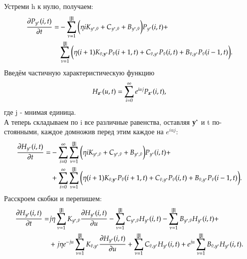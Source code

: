 Устреми h к нулю, получаем:
\begin{align*} 
    \pdv{P_{y^*}(i, t)}{t} =
    &- \sum^{|\mathbb{J}|}_{\nu=1}
        \bigg(\eta i K_{y^*, \tilde{\nu}}
        + C_{y^*, \tilde{\nu}} 
        + B_{{y^*}, \tilde{\nu}}\bigg)
        P_{y^*}(i, t)+\\
    &\sum^{|\mathbb{J}|}_{\nu=1} 
        \bigg(\eta (i+1) K_{\tilde{\nu}, \bold{y}^*}P_{\bold{\tilde{\nu}}}(i+1, t)
        + C_{\tilde{\nu}, y^*}P_{\tilde{\nu}}(i, t) 
        + B_{\tilde{\nu}, y^*}P_{\tilde{\nu}}(i-1, t) \bigg).
\end{align*} 
Введём частичную характеристическую функцию \[H_{\bold{z}^*}(u,t)=\sum_{i=0}^\infty e^{iuj}P_{\bold{z}^*}(i, t),\] 
где j - мнимая единица.\\
А теперь складываем по i все различные равенства, оставляя \(\bold{y}^*\) и t по-
стоянными, каждое домножив перед этим каждое на \(e^{iuj}\):
\begin{align*}
    \pdv{H_{y^*}(i, t)}{t} =                   
    &- \sum_{i = 0}^{\infty}\sum^{|\mathbb{J}|}_{\nu=1}
        \bigg(\eta i K_{y^*, \tilde{\nu}}
        + C_{y^*, \tilde{\nu}} 
        + B_{{y^*}, \tilde{\nu}}\bigg)
        P_{y^*}(i, t)+\\
    &+\sum_{i = 0}^{\infty}\sum^{|\mathbb{J}|}_{\nu=1} 
        \bigg(\eta (i+1) K_{\tilde{\nu}, \bold{y}^*}P_{\bold{\tilde{\nu}}}(i+1, t)
        + C_{\tilde{\nu}, y^*}P_{\tilde{\nu}}(i, t) 
        + B_{\tilde{\nu}, y^*}P_{\tilde{\nu}}(i-1, t) \bigg).     
\end{align*}
Расскроем скобки и перепишем:
\begin{align*} 
    \pdv{H_{y^*}(i, t)}{t} =                   
	& j\eta \sum^{|\mathbb{J}|}_{\nu=1} K_{y^*, \tilde{\nu}}\pdv{H_{y^*}(i, t)}{u}
        - \sum^{|\mathbb{J}|}_{\nu=1}C_{y^*, \tilde{\nu}} H_{y^*}(i, t)
        - \sum^{|\mathbb{J}|}_{\nu=1}B_{{y^*}, \tilde{\nu}}H_{y^*}(i, t)+\\
	&+j\eta e^{-ju} \sum^{|\mathbb{J}|}_{\nu=1} K_{\tilde{\nu}, y^*}\pdv{H_{y^*}(i, t)}{u}
        + \sum^{|\mathbb{J}|}_{\nu=1}C_{\tilde{\nu}, y^*}H_{y^*}(i, t) 
	+ e^{ju}\sum^{|\mathbb{J}|}_{\nu=1}B_{\tilde{\nu}, y^*}H_{y^*}(i, t).     
\end{align*}
